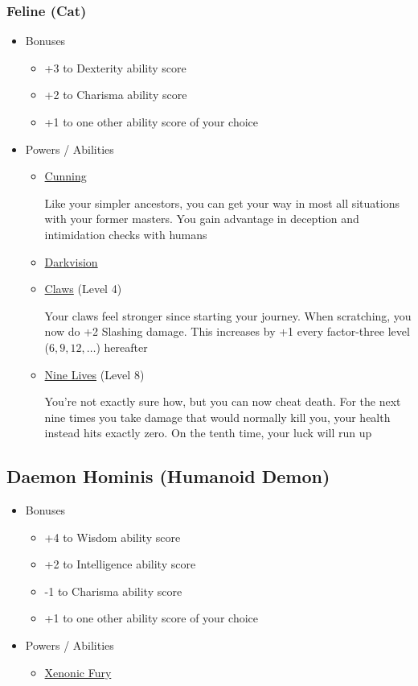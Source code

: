 \documentclass[12pt, landscape]{article}
\begin{document}
\begin{FlushLeft}
\begin{multicols}{2}
			\subsubsection{Feline (Cat)}
			\begin{itemize}
				\item Bonuses
				\begin{itemize}
					\item +3 to Dexterity ability score
					\item +2 to Charisma ability score
					\item +1 to one other ability score of your choice
				\end{itemize}
				\item Powers / Abilities
				\begin{itemize}
					\item \underline{Cunning}

					Like your simpler ancestors, you can get your way in most all situations with your former masters. You gain advantage in deception and intimidation checks with humans
					\item \underline{Darkvision}
					\item \underline{Claws} (Level 4)

					Your claws feel stronger since starting your journey. When scratching, you now do +2 Slashing damage. This increases by +1 every factor-three level ($6, 9, 12, \dots$) hereafter

					\item \underline{Nine Lives} (Level 8)

					You’re not exactly sure how, but you can now cheat death. For the next nine times you take damage that would normally kill you, your health instead hits exactly zero. On the tenth time, your luck will run up
				\end{itemize}
			\end{itemize}
			\vfill \pagebreak

			\subsection{Daemon Hominis (Humanoid Demon)}
			\begin{itemize}
				\item Bonuses
				\begin{itemize}
					\item +4 to Wisdom ability score
					\item +2 to Intelligence ability score
					\item -1 to Charisma ability score
					\item +1 to one other ability score of your choice
				\end{itemize}
				\item Powers / Abilities
				\begin{itemize}
					\item \underline{Xenonic Fury}


\end{itemize}
\end{itemize}
\end{multicols}
\end{FlushLeft}
\end{document}
